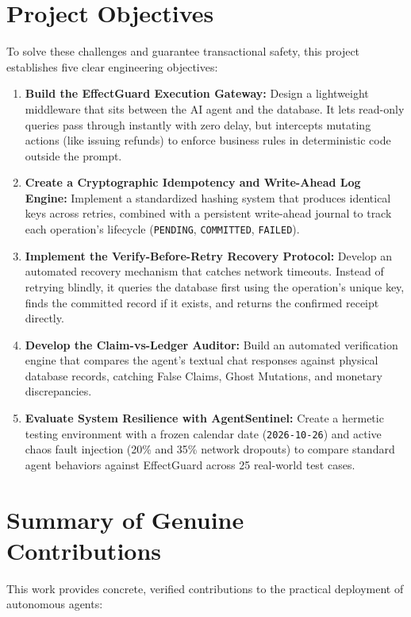 \section{Project Objectives}

To solve these challenges and guarantee transactional safety, this project establishes five clear engineering objectives:

\begin{enumerate}
    \item \textbf{Build the EffectGuard Execution Gateway:} Design a lightweight middleware that sits between the AI agent and the database. It lets read-only queries pass through instantly with zero delay, but intercepts mutating actions (like issuing refunds) to enforce business rules in deterministic code outside the prompt.
    \item \textbf{Create a Cryptographic Idempotency and Write-Ahead Log Engine:} Implement a standardized hashing system that produces identical keys across retries, combined with a persistent write-ahead journal to track each operation's lifecycle (\texttt{PENDING}, \texttt{COMMITTED}, \texttt{FAILED}).
    \item \textbf{Implement the Verify-Before-Retry Recovery Protocol:} Develop an automated recovery mechanism that catches network timeouts. Instead of retrying blindly, it queries the database first using the operation's unique key, finds the committed record if it exists, and returns the confirmed receipt directly.
    \item \textbf{Develop the Claim-vs-Ledger Auditor:} Build an automated verification engine that compares the agent's textual chat responses against physical database records, catching False Claims, Ghost Mutations, and monetary discrepancies.
    \item \textbf{Evaluate System Resilience with AgentSentinel:} Create a hermetic testing environment with a frozen calendar date (\texttt{2026-10-26}) and active chaos fault injection (20\% and 35\% network dropouts) to compare standard agent behaviors against EffectGuard across 25 real-world test cases.
\end{enumerate}

\section{Summary of Genuine Contributions}

This work provides concrete, verified contributions to the practical deployment of autonomous agents:

